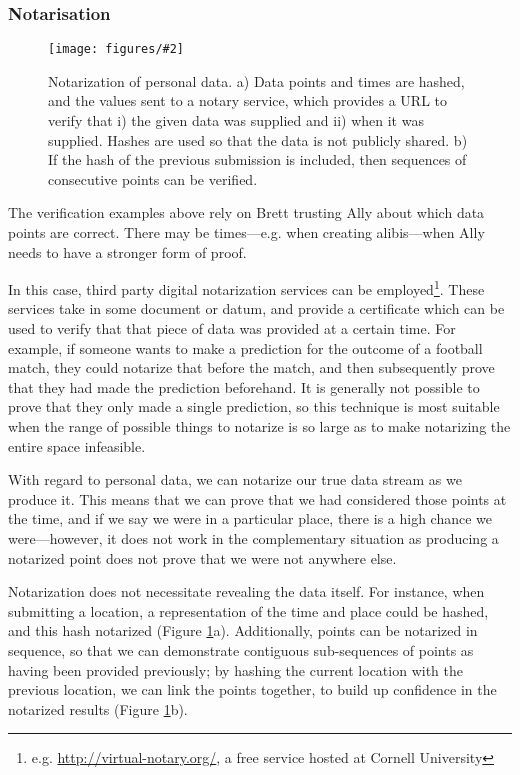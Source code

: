 \documentclass{IOS-Book-Article}     %
\newcommand{\fig}[3][0.9]{
\begin{figure}[tp]
\begin{center}
\texttt{[image: figures/\#2]}
\caption{#3}
\label{fig:#2}
\end{center}
\end{figure}
}
\begin{document}
\subsubsection{Notarisation}
\fig{Notarization}{Notarization of personal data. a) Data points and times are
hashed, and the values sent to a notary service, which provides a URL to verify
that i) the given data was supplied and ii) when it was supplied. Hashes are
used so that the data is not publicly shared. b) If the hash of the previous
submission is included, then sequences of consecutive points can be verified.}

The verification examples above rely on Brett trusting Ally about which
data points are correct. There may be times---e.g. when creating alibis---when
Ally needs to have a stronger form of proof.

In this case, third party digital notarization services can be
employed\footnote{e.g.
\url{http://virtual-notary.org/}, a free service hosted at Cornell University}.
These services take in some document or datum, and provide a certificate which
can be used to verify that that piece of data was provided at a certain time. 
For example, if someone wants to make a prediction
for the outcome of a football match, they could notarize that before the match,
and then subsequently prove that they had made the prediction beforehand. It is
generally not possible to prove that they only made a single prediction, so this technique is most suitable when the range of possible things to notarize
is so large as to make notarizing the entire space infeasible.

With regard to personal data, we can notarize our true data stream as we produce
it. This means that we can prove that we had considered those points at the
time, and if we say we were in a particular place, there is a high chance we
were---however, it does not work in the complementary situation as producing a
notarized point does not prove that we were not anywhere else.


Notarization does not necessitate revealing the data itself. For instance,
when submitting a location, a representation of the time and place could be
hashed, and this hash notarized (Figure \ref{fig:Notarization}a). Additionally,
points can be notarized in sequence, so that we can demonstrate contiguous sub-sequences 
of points as having been provided previously; by
hashing the current location with the previous location, we can link the points
together, to build up confidence in the notarized results (Figure
\ref{fig:Notarization}b).
\end{document}
